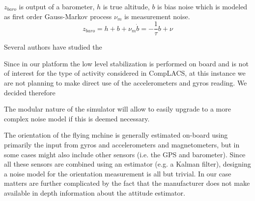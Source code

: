 \documentclass[a4paper,11pt]{report}
\begin{document}

$z_{baro}$ is output of a barometer, $h$ is true altitude, $b$ is bias noise which is modeled as first order 
Gauss-Markov process $\nu_m$ is measurement noise.
    \begin{equation}
      z_{baro}=h+b+\nu_m
      \dot{b}=-\frac{1}{\tau}b+\nu
    \end{equation}
 

Several authors have studied the 

Since in our platform the low level stabilization is performed on board and is not of interest for the type of activity considered in CompLACS, at this instance we are not planning to make direct use of the accelerometers and gyros reading. We decided therefore

The modular nature of the simulator will allow to easily upgrade to a more complex noise model if this is deemed necessary.   




The orientation of the flying mchine is generally estimated on-board using primarily the input from gyros and accelerometers and magnetometers, but in some cases might also include  other sensors (i.e. the GPS and barometer). Since all these sensors are combined using an estimator (e.g. a Kalman filter), designing a noise model for the orientation measurement is all but trivial. In our case matters are further complicated by the fact that the manufacturer does not make available in depth information about the attitude estimator.
 
\end{document}
